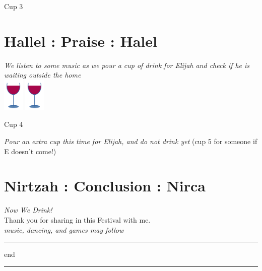 \documentclass[a5paper,10pt]{memoir}
\begin{document}
\begin{center}
	\noindent \large \color{midblue} Cup 3
\end{center}
\Kaddeish

\section{Hallel : Praise : Halel}
\textit{\color{midblue} We listen to some music as we pour a cup of drink for Elijah and check if he is waiting outside the home}\\
\color{black}
\Hallel
\vspace*{2ex}
{\hspace*{100mm} \includegraphics[width=10mm]{cup} \includegraphics[width=10mm]{cup}}
\vspace*{-15ex}  %
\raggedright
\begin{center}
	\noindent \large \color{midblue} Cup 4
\end{center}
\textit{\color{midblue} Pour an extra cup this time for Elijah, and do not drink yet}
\Kaddeish
\vspace*{2ex}
\Elijah \centering (cup 5 for someone if E doesn't come!)\\ \raggedright
% 

\section{Nirtzah : Conclusion : Nirca}
\Nirtzah
% 
\vspace*{4ex}
\textit{\Large Now We Drink!}
\vspace*{\4ex}\\
Thank you for sharing in this Festival with me.
\vspace*{4ex}\\
\textit{music, dancing, and games may follow}
\vfill
{\color{cyan} \rule{\linewidth}{0.5mm}}
\vspace*{2ex}
\begin{center}
	{end}
\end{center}
\vspace*{2ex}
{\color{cyan} \rule{\linewidth}{0.5mm}}

\end{document}
